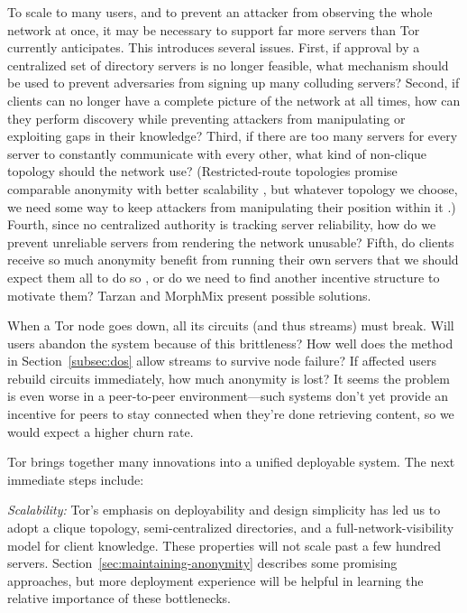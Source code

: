 \documentclass[times,10pt,twocolumn]{article}
\begin{document}
To scale to many users, and to prevent an attacker from observing the
whole network at once, it may be necessary
to support far more servers than Tor currently anticipates.
This introduces several issues.  First, if approval by a centralized set
of directory servers is no longer feasible, what mechanism should be used
to prevent adversaries from signing up many colluding servers? Second,
if clients can no longer have a complete picture of the network at all
times, how can they perform discovery while preventing attackers from
manipulating or exploiting gaps in their knowledge?  Third, if there
are too many servers for every server to constantly communicate with
every other, what kind of non-clique topology should the network use?
(Restricted-route topologies promise comparable anonymity with better
scalability \cite{danezis-pets03}, but whatever topology we choose, we
need some way to keep attackers from manipulating their position within
it \cite{casc-rep}.) Fourth, since no centralized authority is tracking
server reliability, how do we prevent unreliable servers from rendering
the network unusable?  Fifth, do clients receive so much anonymity benefit
from running their own servers that we should expect them all to do so
\cite{econymics}, or do we need to find another incentive structure to
motivate them?  Tarzan and MorphMix present possible solutions.


When a Tor node goes down, all its circuits (and thus streams) must break.
Will users abandon the system because of this brittleness? How well
does the method in Section~\ref{subsec:dos} allow streams to survive
node failure? If affected users rebuild circuits immediately, how much
anonymity is lost? It seems the problem is even worse in a peer-to-peer
environment---such systems don't yet provide an incentive for peers to
stay connected when they're done retrieving content, so we would expect
a higher churn rate.


\label{sec:conclusion}

Tor brings together many innovations into a unified deployable system. The
next immediate steps include:

\emph{Scalability:} Tor's emphasis on deployability and design simplicity
has led us to adopt a clique topology, semi-centralized
directories, and a full-network-visibility model for client
knowledge. These properties will not scale past a few hundred servers.
Section~\ref{sec:maintaining-anonymity} describes some promising
approaches, but more deployment experience will be helpful in learning
the relative importance of these bottlenecks.
\end{document}
